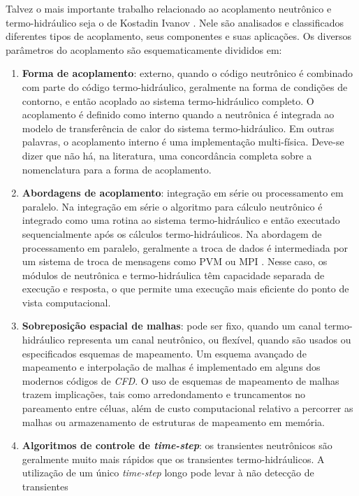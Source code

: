 Talvez o mais importante trabalho relacionado ao acoplamento 
neutrônico e termo-hidráulico seja o de Kostadin Ivanov \cite{Ivanov2007}. Nele são analisados e classificados diferentes tipos de 
acoplamento, seus componentes e suas aplicações. Os diversos parâmetros do acoplamento são esquematicamente divididos em: 
\begin{enumerate}
\item \textbf{Forma de acoplamento}: externo, quando o código neutrônico é combinado com parte do código termo-hidráulico, 
geralmente na forma de condições de contorno, e então acoplado ao sistema termo-hidráulico completo. O acoplamento 
é definido como interno quando a neutrônica é integrada ao modelo de transferência de calor do sistema termo-hidráulico. 
Em outras palavras, o acoplamento interno é uma implementação multi-física. Deve-se dizer que não há, na literatura, uma
concordância completa sobre a nomenclatura para a forma de acoplamento. 
\item \textbf{Abordagens de acoplamento}: integração em série ou processamento em paralelo. Na integração em série o algoritmo 
para cálculo neutrônico é integrado como uma rotina ao sistema termo-hidráulico e então executado sequencialmente 
após os cálculos termo-hidráulicos. Na abordagem de processamento em paralelo, geralmente a troca de dados é 
intermediada por um sistema de troca de mensagens como PVM \cite{Geist94} ou MPI \cite{Quinn2004}. Nesse caso, os 
módulos de neutrônica e termo-hidráulica têm capacidade separada de execução e resposta, o que permite uma execução 
mais eficiente do ponto de vista computacional.
\item \textbf{Sobreposição espacial de malhas}: pode ser fixo, quando um canal termo-hidráulico representa um canal neutrônico, 
ou flexível, quando são usados ou especificados esquemas de mapeamento. Um esquema avançado de mapeamento 
e interpolação de malhas \cite{Beaudoin2008} é implementado em alguns dos modernos códigos de \textit{CFD}.
O uso de esquemas de mapeamento de malhas trazem implicações, tais como arredondamento e truncamentos no pareamento
entre céluas, além de custo computacional relativo a percorrer as malhas ou armazenamento de estruturas de mapeamento
em memória.
\item \textbf{Algoritmos de controle de \textit{time-step}}: os transientes neutrônicos são geralmente muito mais rápidos que 
os transientes termo-hidráulicos. A utilização de um único \textit{time-step} longo pode levar à não detecção de transientes 

\end{enumerate}
